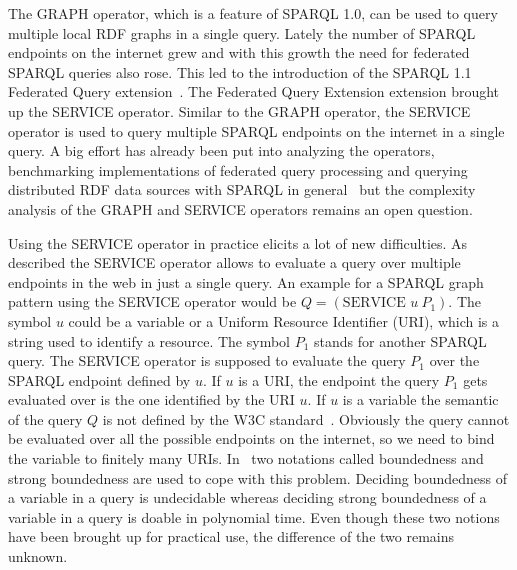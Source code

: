 The GRAPH operator, which is a feature of SPARQL 1.0, can be used to query
multiple local RDF graphs in a single query. Lately the number of SPARQL endpoints
on the internet grew and with this growth the need for federated
SPARQL queries also rose. This led to the introduction of the SPARQL 1.1 Federated Query
extension~\cite{w3fed}. The Federated Query Extension extension brought up the SERVICE operator. 
Similar to the GRAPH operator, the SERVICE operator is
used to query multiple SPARQL endpoints on the internet in a single query. 
A big effort has already been put into analyzing the operators, benchmarking
implementations of federated query processing
and querying distributed RDF data sources with SPARQL in
general~\cite{BuilAranda20131,schwarte2011fedx,quilitz2008querying,
buil2014towards,montoya2015federated,
saleem2013daw,acosta2011anapsid,gorlitz2011splendid,
hose2012towards,buil2014strategies} but the complexity 
analysis of the GRAPH and SERVICE operators remains an open question.

Using the SERVICE operator in practice elicits a lot of new difficulties.
As described the SERVICE operator allows to evaluate a query over multiple
endpoints in the web in just a single query. An example for a SPARQL graph
pattern using the SERVICE operator would be $Q = (\mbox{SERVICE } u \ P_1)$.
The symbol $u$ could be a variable or a Uniform Resource Identifier (URI), which is a
string used to identify a resource. The symbol $P_1$ stands for another SPARQL
query. The SERVICE operator is supposed to evaluate the query $P_1$ over the
SPARQL endpoint defined by $u$. If $u$ is a URI, the endpoint the query $P_1$ gets
evaluated over is the one identified by the URI $u$. 
If $u$ is a variable the semantic of the query $Q$ is not defined by the
W3C standard~\cite{w3standardservice}. 
Obviously the query cannot be evaluated over all the possible endpoints on the internet, so we need to bind the variable to finitely many URIs. 
In~\cite{BuilAranda20131} two notations called
boundedness and strong boundedness are used to cope with this problem.
Deciding boundedness of a variable in a query is undecidable whereas deciding strong
boundedness of a variable in a query is doable in polynomial time. Even though
these two notions have been brought up for practical use, the difference of the two remains
unknown.

